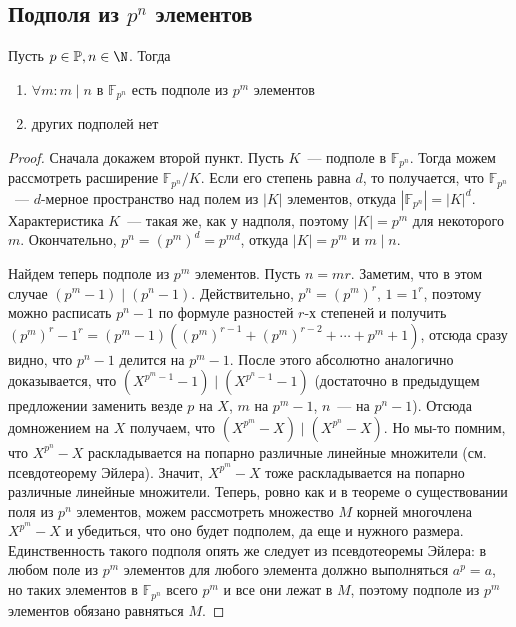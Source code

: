 \subsection{Подполя из $p^n$ элементов}
\begin{theorem-non}
    Пусть $p\in\mathbb{P}, n\in \N$.
    Тогда
    \begin{enumerate}
        \item $\forall m: m\mid n$ в $\mathbb{F}_{p^n}$ есть подполе из $p^m$ элементов
        \item других подполей нет
    \end{enumerate}
\end{theorem-non}
\begin{proof}
    Сначала докажем второй пункт.
    Пусть $K$~--- подполе в $\mathbb{F}_{p^n}$.
    Тогда можем рассмотреть расширение $\mathbb{F}_{p^n} / K$.
    Если его степень равна $d$, то получается, что $\mathbb{F}_{p^n}$~--- $d$-мерное пространство над полем из $|K|$ элементов, откуда $|\mathbb{F}_{p^n}| = |K|^d$.
    Характеристика $K$~--- такая же, как у надполя, поэтому $|K|=p^m$ для некоторого $m$.
    Окончательно, $p^n = (p^m)^d = p^{md}$, откуда $|K| = p^m$ и $m \mid n$.\medskip

    Найдем теперь подполе из $p^m$ элементов.
    Пусть $n=mr$.
    Заметим, что в этом случае $(p^m-1) \mid (p^n-1)$.
    Действительно, $p^n = (p^m)^r$, $1=1^r$, поэтому можно расписать $p^n-1$ по формуле разностей $r$-х степеней и получить $(p^m)^r - 1^r = (p^m-1)((p^m)^{r-1} + (p^m)^{r-2}+\cdots + p^m + 1)$, отсюда сразу видно, что $p^n-1$ делится на $p^m-1$.
    После этого абсолютно аналогично доказывается, что $(X^{p^m-1}-1) \mid (X^{p^n-1}-1)$ (достаточно в предыдущем предложении заменить везде $p$ на $X$, $m$ на $p^m-1$, $n$~--- на $p^n-1$).
    Отсюда домножением на $X$ получаем, что $(X^{p^m}-X) \mid (X^{p^n}-X)$.
    Но мы-то помним, что $X^{p^n}-X$ раскладывается на попарно различные линейные множители (см. псевдотеорему Эйлера).
    Значит, $X^{p^m}-X$ тоже раскладывается на попарно различные линейные множители.
    Теперь, ровно как и в теореме о существовании поля из $p^n$ элементов, можем рассмотреть множество $M$ корней многочлена $X^{p^m}-X$ и убедиться, что оно будет подполем, да еще и нужного размера.
    Единственность такого подполя опять же следует из псевдотеоремы Эйлера: в любом поле из $p^m$ элементов для любого элемента должно выполняться $a^p=a$, но таких элементов в $\mathbb{F}_{p^n}$ всего $p^m$ и все они лежат в $M$, поэтому подполе из $p^m$ элементов обязано равняться $M$.
\end{proof}
